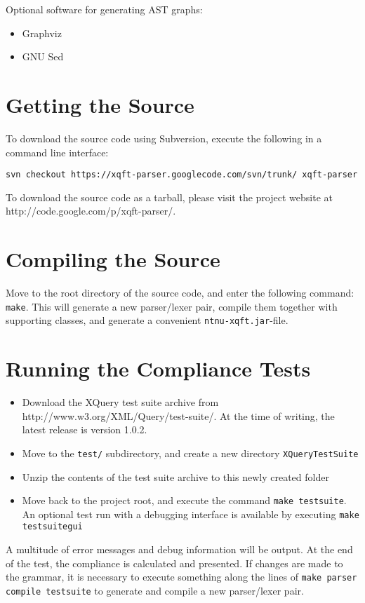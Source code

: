 Optional software for generating AST graphs:
\begin{itemize}
  \item Graphviz
  \item GNU Sed
\end{itemize}

\section*{Getting the Source}
To download the source code using Subversion, execute the following in a
command line interface:

\verb!svn checkout https://xqft-parser.googlecode.com/svn/trunk/ xqft-parser!

To download the source code as a tarball, please visit the project website at
http://code.google.com/p/xqft-parser/.

\section*{Compiling the Source}
Move to the root directory of the source code, and enter the following command:
\verb!make!. This will generate a new parser/lexer pair, compile them together
with supporting classes, and generate a convenient \verb!ntnu-xqft.jar!-file.

\section*{Running the Compliance Tests}
\begin{itemize}
\item Download the XQuery test suite archive from
http://www.w3.org/XML/Query/test-suite/. At the time of writing, the latest
release is version 1.0.2. 
\item Move to the \verb!test/! subdirectory, and create a new directory
\verb!XQueryTestSuite!
\item Unzip the contents of the test suite archive to this newly created folder
\item Move back to the project root, and execute the command 
\verb!make testsuite!. An optional test run with a debugging interface is
available by executing \verb!make testsuitegui!
\end{itemize}

A multitude of error messages and debug information will be output. At the end
of the test, the compliance is calculated and presented. If changes are made to
the grammar, it is necessary to execute something along the lines of 
\verb!make parser compile testsuite! to generate and compile a new parser/lexer
pair.